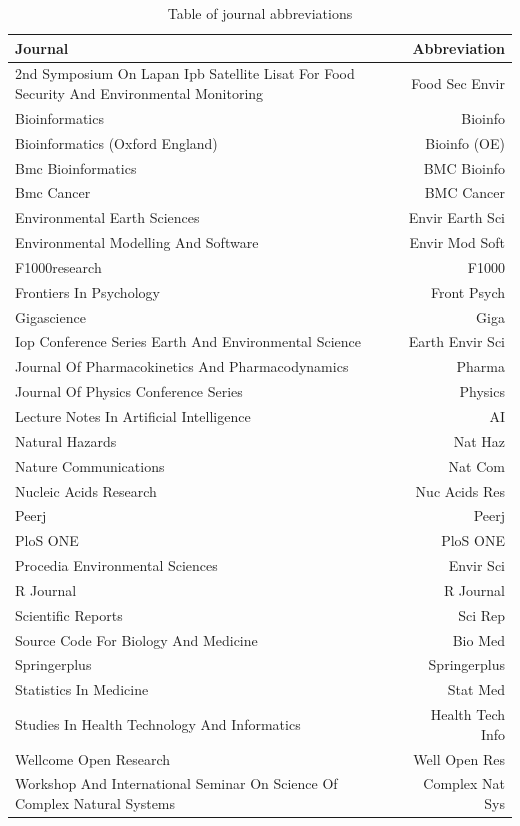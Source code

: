 \begin{table}[h]
	\caption{Table of journal abbreviations}
	\label{Tab:Abb} 
	\renewcommand{\arraystretch}{0.5}
	\centering
	\begin{tabular}{ p{10cm} | r }
		\toprule
		Journal & Abbreviation \\
		\toprule
		2nd Symposium On Lapan Ipb Satellite Lisat For Food Security And Environmental Monitoring & Food Sec Envir \\
		Bioinformatics & Bioinfo \\
		Bioinformatics (Oxford England) & Bioinfo (OE) \\
		Bmc Bioinformatics & BMC Bioinfo \\
		Bmc Cancer & BMC Cancer \\
		Environmental Earth Sciences & Envir Earth Sci \\
		Environmental Modelling And Software & Envir Mod Soft \\
		F1000research & F1000 \\
		Frontiers In Psychology & Front Psych \\
		Gigascience & Giga \\
		Iop Conference Series Earth And Environmental Science & Earth Envir Sci \\
		Journal Of Pharmacokinetics And Pharmacodynamics & Pharma \\
		Journal Of Physics Conference Series & Physics \\
		Lecture Notes In Artificial Intelligence & AI \\
		Natural Hazards & Nat Haz \\
		Nature Communications & Nat Com \\
		Nucleic Acids Research & Nuc Acids Res \\
		Peerj & Peerj \\
		PloS ONE & PloS ONE \\
		Procedia Environmental Sciences & Envir Sci \\
		R Journal & R Journal \\
		Scientific Reports & Sci Rep \\
		Source Code For Biology And Medicine & Bio Med \\
		Springerplus & Springerplus \\
		Statistics In Medicine & Stat Med \\
		Studies In Health Technology And Informatics & Health Tech Info \\
		Wellcome Open Research & Well Open Res \\
		Workshop And International Seminar On Science Of Complex Natural Systems & Complex Nat Sys \\
		\bottomrule
	\end{tabular}
\end{table}

